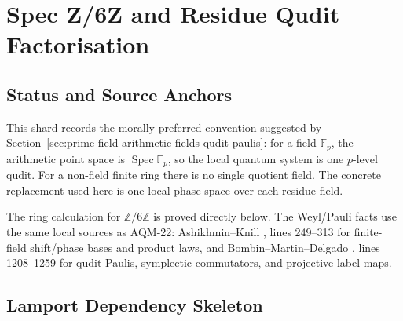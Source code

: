 
\section{Spec Z/6Z and Residue Qudit Factorisation}
\label{sec:spec-z6-residue-qudit-factorisation}

\subsection{Status and Source Anchors}

This shard records the morally preferred convention suggested by
Section~\ref{sec:prime-field-arithmetic-fields-qudit-paulis}: for a field
\(\mathbb F_p\), the arithmetic point space is \(\operatorname{Spec}\mathbb F_p\),
so the local quantum system is one \(p\)-level qudit.  For a non-field finite
ring there is no single quotient field.  The concrete replacement used here is
one local phase space over each residue field.

The ring calculation for \(\mathbb Z/6\mathbb Z\) is proved directly below.
The Weyl/Pauli facts use the same local sources as AQM-22: Ashikhmin--Knill
,
lines 249--313 for finite-field shift/phase bases and product laws, and
Bombin--Martin--Delgado
,
lines 1208--1259 for qudit Paulis, symplectic commutators, and projective
label maps.

\subsection{Lamport Dependency Skeleton}


